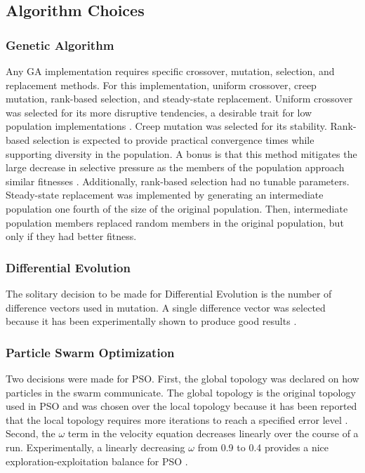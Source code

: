 \documentclass[twoside,11pt]{article}
\begin{document}
\subsection{Algorithm Choices}


\subsubsection{Genetic Algorithm}

	Any GA implementation requires specific crossover, mutation, selection, and replacement methods. For this implementation, uniform crossover, creep mutation, rank-based selection, and steady-state replacement. Uniform crossover was selected for its more disruptive tendencies, a desirable trait for low population implementations \citep{ga_tutorial}. Creep mutation was selected for its stability. Rank-based selection is expected to provide practical convergence times while supporting diversity in the population. A bonus is that this method mitigates the large decrease in selective pressure as the members of the population approach similar fitnesses \citep{ga_tutorial}. Additionally, rank-based selection had no tunable parameters. Steady-state replacement was implemented by generating an intermediate population one fourth of the size of the original population. Then, intermediate population members replaced random members in the original population, but only if they had better fitness.

\subsubsection{Differential Evolution}
	
	The solitary decision to be made for Differential Evolution is the number of difference vectors  used in mutation. 
	A single difference vector was selected because it has been experimentally shown to produce good results \cite{gamperle2002parameter}.

\subsubsection{Particle Swarm Optimization}

	Two decisions were made for PSO. First, the global topology was declared on how particles in the swarm communicate.
	The global topology is the original topology used in PSO and was chosen over the local topology because it has been reported that the local topology requires more iterations to reach a specified error level \citep{og-pso}.
	Second, the $\omega$ term in the velocity equation decreases linearly over the course of a run. Experimentally, a linearly decreasing $\omega$ from 0.9 to 0.4 provides a nice exploration-exploitation balance for PSO \citep{inertia}.
\end{document}
